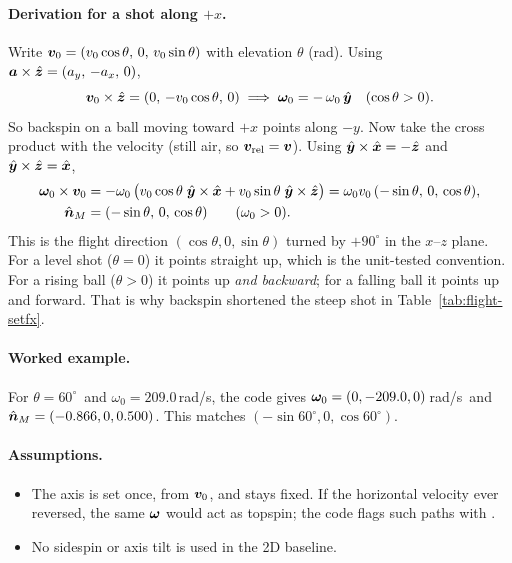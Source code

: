\paragraph{Derivation for a shot along $+x$.}
Write $\bm{v}_0 = (v_0\cos\theta,\,0,\,v_0\sin\theta)$ with elevation $\theta$ (\unit{rad}).
Using $\bm{a}\times\hat{\bm{z}} = (a_y,\,-a_x,\,0)$,
\begin{equation}
  \bm{v}_0\times\hat{\bm{z}} = (0,\,-v_0\cos\theta,\,0)
  \;\Longrightarrow\;
  \bm{\omega}_0 = -\,\omega_0\,\hat{\bm{y}} \quad (\cos\theta > 0).
  \label{eq:flight-axis-x}
\end{equation}
So backspin on a ball moving toward $+x$ points along $-y$.
Now take the cross product with the velocity (still air, so $\bm{v}_{\mathrm{rel}}=\bm{v}$).
Using $\hat{\bm{y}}\times\hat{\bm{x}} = -\hat{\bm{z}}$ and $\hat{\bm{y}}\times\hat{\bm{z}} = \hat{\bm{x}}$,
\begin{align}
  \bm{\omega}_0\times\bm{v}_0
    &= -\omega_0\,\bigl(v_0\cos\theta\;\hat{\bm{y}}\times\hat{\bm{x}} + v_0\sin\theta\;\hat{\bm{y}}\times\hat{\bm{z}}\bigr)
     = \omega_0 v_0\,(-\sin\theta,\,0,\,\cos\theta), \nonumber\\
  \hat{\bm{n}}_M &= (-\sin\theta,\,0,\,\cos\theta) \qquad (\omega_0 > 0). \label{eq:flight-nM-back}
\end{align}
This is the flight direction $(\cos\theta, 0, \sin\theta)$ turned by $+90^\circ$ in the $x$--$z$ plane.
For a level shot ($\theta = 0$) it points straight up, which is the unit-tested convention.
For a rising ball ($\theta > 0$) it points up \emph{and backward}; for a falling ball it points up and
forward.
That is why backspin shortened the steep shot in Table~\ref{tab:flight-setfx}.

\paragraph{Worked example.}
For $\theta = 60^\circ$\assumed\ and $\omega_0 = 209.0$\,\unit{rad/s}\derived, the code gives
$\bm{\omega}_0 = (0, -209.0, 0)$\,\unit{rad/s}\derived\ and
$\hat{\bm{n}}_M = (-0.866, 0, 0.500)$\derived.
This matches $(-\sin 60^\circ, 0, \cos 60^\circ)$.

\paragraph{Assumptions.}
\begin{itemize}
  \item The axis is set once, from $\bm{v}_0$, and stays fixed.
    If the horizontal velocity ever reversed, the same $\bm{\omega}$ would act as topspin; the code
    flags such paths with .
  \item No sidespin or axis tilt is used in the 2D baseline.
\end{itemize}

